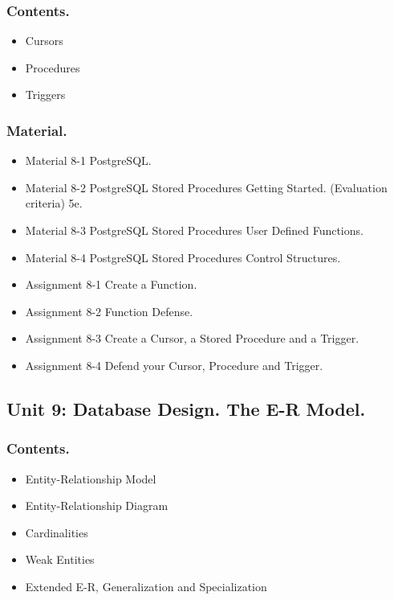 \documentclass[catalan, a4paper, 12pt, titlepage]{article}
\begin{document}
  \subsubsection{Contents.}
  \begin{itemize}
	  \item Cursors
	  \item Procedures
	  \item Triggers
  \end{itemize}

  \subsubsection{Material.}
  \begin{itemize}
	  \item Material 8-1 PostgreSQL.
	  \item Material 8-2 PostgreSQL Stored Procedures Getting Started. (\faGraduationCap Evaluation criteria) 5e.
	  \item Material 8-3 PostgreSQL Stored Procedures User Defined Functions.
	  \item Material 8-4 PostgreSQL Stored Procedures Control Structures.
	  \item Assignment 8-1 Create a Function.
	  \item Assignment 8-2 Function Defense.
	  \item Assignment 8-3 Create a Cursor, a Stored Procedure and a Trigger.
	  \item Assignment 8-4 Defend your Cursor, Procedure and Trigger.
  \end{itemize}

  \subsection{Unit 9: Database Design. The E-R Model.}

  \subsubsection{Contents.}
  \begin{itemize}
	  \item Entity-Relationship Model
	  \item Entity-Relationship Diagram
	  \item Cardinalities
	  \item Weak Entities
	  \item Extended E-R, Generalization and Specialization
  \end{itemize}
\end{document}
